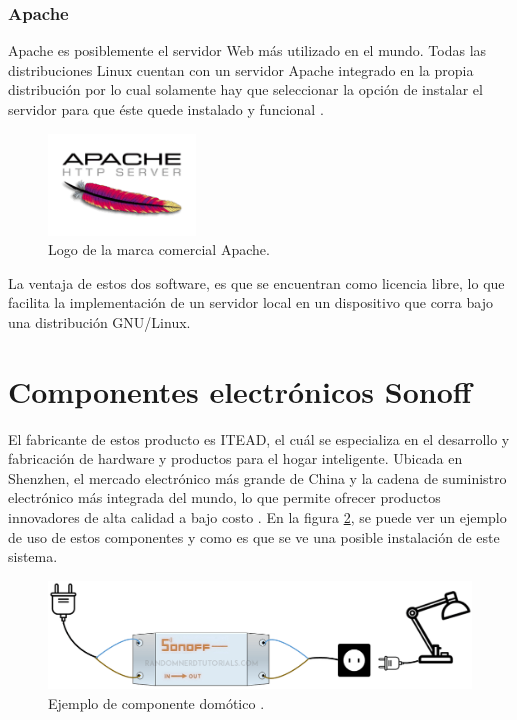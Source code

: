 \subsubsection{Apache}
Apache es posiblemente el servidor Web más utilizado en el mundo. Todas las distribuciones Linux cuentan con un servidor Apache integrado en la propia distribución por lo cual solamente hay que seleccionar la opción de instalar el servidor para que éste quede instalado y funcional \cite{Apache2018}.

\begin{figure}[H]
\centering
\includegraphics[width=0.35\textwidth]{./imagenes/teoria/apache.png} 
\caption{Logo de la marca comercial Apache.}
\label{F:APACHE}
\end{figure}

La ventaja de estos dos software, es que se encuentran como licencia libre, lo que facilita la implementación de un servidor local en un dispositivo que corra bajo una distribución GNU/Linux. 


\section{Componentes electrónicos Sonoff}
El fabricante de estos producto es ITEAD, el cuál se especializa en el desarrollo y fabricación de hardware y productos para el hogar inteligente. Ubicada en Shenzhen, el mercado electrónico más grande de China y la cadena de suministro electrónico más integrada del mundo, lo que permite ofrecer productos innovadores de alta calidad a bajo costo \cite{Sonoff2018}. En la figura \ref{F:sonoff}, se puede ver un ejemplo de uso de estos componentes y como es que se ve una posible instalación de este sistema.

\begin{figure}[H]
\centering
\includegraphics[width=\textwidth]{./imagenes/teoria/SONOFF_circuit.png} 
\caption{Ejemplo de componente domótico \cite{Sonoff2018}.}
\label{F:sonoff}
\end{figure}

